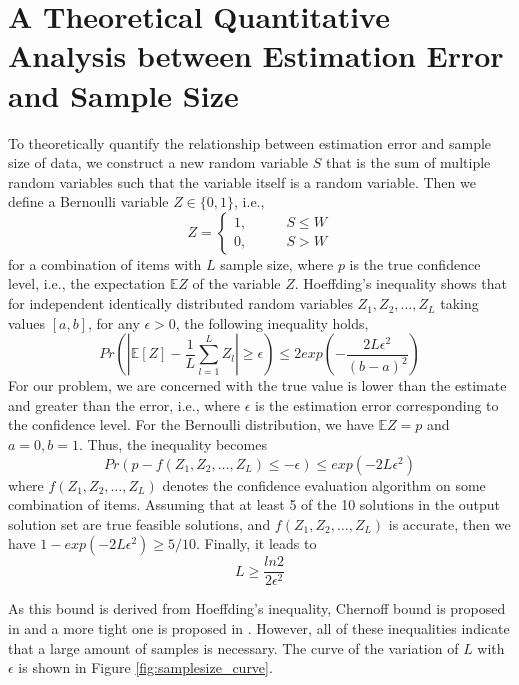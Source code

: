 \documentclass[lettersize,journal]{IEEEtran}
\begin{document}
\section{A Theoretical Quantitative Analysis between Estimation Error and Sample Size}
To theoretically quantify the relationship between estimation error and sample size of data, we construct a new random variable $S$ that is the sum of multiple random variables such that the variable itself is a random variable. 
Then we define a Bernoulli variable $Z\in \{0,1\}$, i.e.,
\begin{equation}
    Z=\left\{
\begin{aligned}
1, &\quad\quad S\leq W \\
0, &\quad\quad S> W
\end{aligned}
\right.
\end{equation}
for a combination of items with $L$ sample size, where $p$ is the true confidence level, i.e., the expectation $\mathbb{E}Z$ of the variable $Z$. 
Hoeffding's inequality shows that for independent identically distributed random variables $Z_1,Z_2,\ldots,Z_L$ taking values $[a,b]$, for any $\epsilon>0$, the following inequality holds,
\begin{equation}
    Pr(|\mathbb{E}[Z]-\frac{1}{L}\sum_{l=1}^L Z_l|\geq \epsilon)\leq 2exp(-\frac{2L\epsilon^2}{(b-a)^2})
\end{equation}
For our problem, we are concerned with the true value is lower than the estimate and greater than the error, i.e., where $\epsilon$ is the estimation error corresponding to the confidence level. 
For the Bernoulli distribution, we have $\mathbb{E}Z=p$ and $a=0,b=1$. 
Thus, the inequality becomes
\begin{equation}
    Pr(p-f(Z_1,Z_2,\ldots,Z_L)\leq -\epsilon)\leq exp(-2L\epsilon^2)
\end{equation}
where $f(Z_1,Z_2,\ldots,Z_L)$ denotes the confidence evaluation algorithm on some combination of items. 
Assuming that at least 5 of the 10 solutions in the output solution set are true feasible solutions, and $f(Z_1,Z_2,\ldots,Z_L)$ is accurate, then we have $1-exp(-2L\epsilon^2)\geq 5/10$. 
Finally, it leads to 
\begin{equation}
    L\geq \frac{ln2}{2\epsilon^2}
\end{equation}

As this bound is derived from Hoeffding's inequality, Chernoff bound is proposed in \cite{tempo1996probabilistic} and a more tight one is proposed in \cite{alamo2010sample}. 
However, all of these inequalities indicate that a large amount of samples is necessary. 
The curve of the variation of $L$ with $\epsilon$ is shown in Figure \ref{fig:samplesize_curve}.
\end{document}

